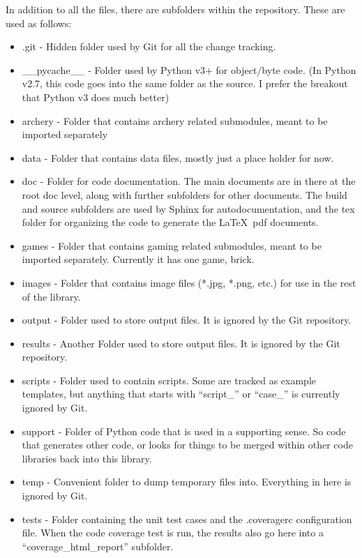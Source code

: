 \documentclass[12pt]{article}
\begin{document}
In addition to all the files, there are subfolders within the repository.  These are used as follows:
\begin{itemize}
    \setlength{\itemsep}{0pt}
    \setlength{\parskip}{0pt}
    \setlength{\parsep}{0pt}
    \item .git - Hidden folder used by Git for all the change tracking.
    \item \_\_pycache\_\_ - Folder used by Python v3+ for object/byte code.  (In Python v2.7, this code goes into the same folder as the source. I prefer the breakout that Python v3 does much better)
    \item archery - Folder that contains archery related submodules, meant to be imported separately
    \item data - Folder that contains data files, mostly just a place holder for now.
    \item doc - Folder for code documentation.  The main documents are in there at the root doc level, along with further subfolders for other documents.  The build and source subfolders are used by Sphinx for autodocumentation, and the tex folder for organizing the code to generate the \LaTeX\ pdf documents.
    \item games - Folder that contains gaming related submodules, meant to be imported separately.  Currently it has one game, brick.
    \item images - Folder that contains image files (*.jpg, *.png, etc.) for use in the rest of the library.
    \item output - Folder used to store output files.  It is ignored by the Git repository.
    \item results - Another Folder used to store output files.  It is ignored by the Git repository.
    \item scripts - Folder used to contain scripts.  Some are tracked as example templates, but anything that starts with ``script\_'' or ``case\_'' is currently ignored by Git.
    \item support - Folder of Python code that is used in a supporting sense.  So code that generates other code, or looks for things to be merged within other code libraries back into this library.
    \item temp - Convenient folder to dump temporary files into.  Everything in here is ignored by Git.
    \item tests - Folder containing the unit test cases and the .coveragerc configuration file.  When the code coverage test is run, the results also go here into a ``coverage\_html\_report'' subfolder.
\end{itemize}
\end{document}
